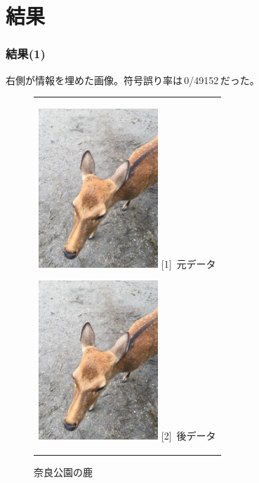 \documentclass[dvipdfmx,11pt,notheorems]{beamer}
\theoremstyle{definition}
\begin{document}
\section{結果}
\begin{frame}\frametitle{結果(1)}
	右側が情報を埋めた画像。符号誤り率は\,0/49152\,だった。

	\begin{figure}[htbp]
		\begin{center}
			\begin{tabular}{c}

				\begin{minipage}{0.5\hsize}
					\begin{center}
						\includegraphics[clip, width=4.5cm]{Nara.jpg}
						\hspace{1.6cm} [1]\ 元データ
					\end{center}
				\end{minipage}

				\begin{minipage}{0.5\hsize}
					\begin{center}
						\includegraphics[clip, width=4.5cm]{StegoNara.png}
						\hspace{1.6cm} [2]\ 後データ
					\end{center}
				\end{minipage}
			\end{tabular}
			\caption{奈良公園の鹿}
			\label{fig:nara}
		\end{center}
	\end{figure}
\end{frame}
\end{document}
